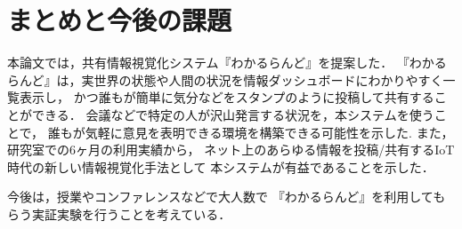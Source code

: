 \section{まとめと今後の課題}
本論文では，共有情報視覚化システム『わかるらんど』を提案した．
『わかるらんど』は，実世界の状態や人間の状況を情報ダッシュボードにわかりやすく一覧表示し，
かつ誰もが簡単に気分などをスタンプのように投稿して共有することができる．
会議などで特定の人が沢山発言する状況を，本システムを使うことで，
誰もが気軽に意見を表明できる環境を構築できる可能性を示した.
また，研究室での6ヶ月の利用実績から，
ネット上のあらゆる情報を投稿/共有するIoT時代の新しい情報視覚化手法として
本システムが有益であることを示した．

今後は，授業やコンファレンスなどで大人数で
『わかるらんど』を利用してもらう実証実験を行うことを考えている．

